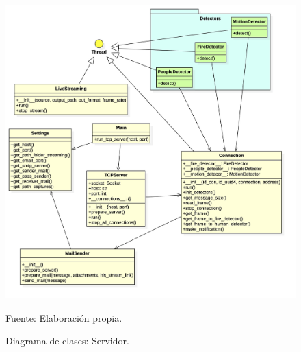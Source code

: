\begin{figure}[H]
    \begin{center}
        \includegraphics[width=18cm]{img/capitulo_4/tcpserver.jpg}
    \end{center}
    \begin{center}
        \caption{Diagrama de clases: Servidor.}
        Fuente: Elaboración propia.
        \label{fig:diag_clases_server}
    \end{center}
\end{figure}

